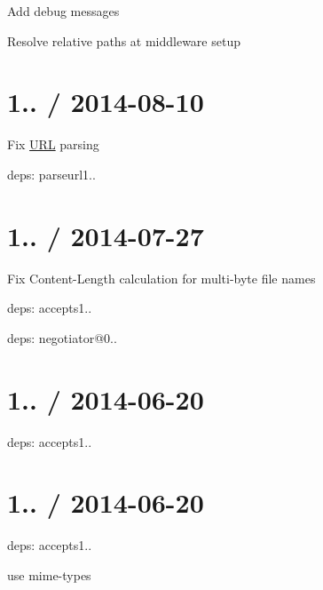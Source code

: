 \begin{DoxyItemize}
\item Add {\ttfamily debug} messages
\item Resolve relative paths at middleware setup
\end{DoxyItemize}

\section*{1.. / 2014-\/08-\/10 }


\begin{DoxyItemize}
\item Fix \mbox{\hyperlink{namespace_u_r_l}{U\+RL}} parsing
\item deps\+: parseurl1..
\end{DoxyItemize}

\section*{1.. / 2014-\/07-\/27 }


\begin{DoxyItemize}
\item Fix Content-\/\+Length calculation for multi-\/byte file names
\item deps\+: accepts1..
\begin{DoxyItemize}
\item deps\+: negotiator@0..
\end{DoxyItemize}
\end{DoxyItemize}

\section*{1.. / 2014-\/06-\/20 }


\begin{DoxyItemize}
\item deps\+: accepts1..
\end{DoxyItemize}

\section*{1.. / 2014-\/06-\/20 }


\begin{DoxyItemize}
\item deps\+: accepts1..
\begin{DoxyItemize}
\item use {\ttfamily mime-\/types}
\end{DoxyItemize}
\end{DoxyItemize}

